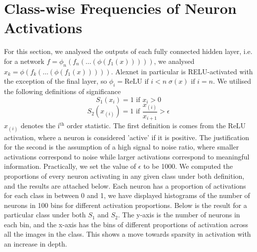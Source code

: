 \documentclass{article}
\begin{document}
    \section{Class-wise Frequencies of Neuron Activations}
        For this section, we analysed the outputs of each fully connected hidden layer, i.e. for a network $f = \phi_{n}(f_{n}(\dots(\phi(f_1(x)))))$, we analysed $x_k = \phi(f_{k}(\dots(\phi(f_1(x)))))$. Alexnet in particular is RELU-activated with the exception of the final layer, so $\phi_i = \text{ReLU} \text{ if } i < n \; \sigma(x) \text{ if } i = n$. We utilised the following definitions of significance \\
        \[S_1(x_{i}) = 1 \text{ if } x_i > 0\] 
        \[S_2(x_{(i)}) = 1 \text{ if } \frac{x_{(i)}}{x_{i+1}} > \epsilon\] 
        $x_{(i)}$ denotes the i$^\text{th}$ order statistic. The first definition is comes from the ReLU activation, where a neuron is considered 'active' if it is positive. The justification for the second is the assumption of a high signal to noise ratio, where smaller activations correspond to noise while larger activations correspond to meaningful information. Practically, we set the value of $\epsilon$ to be 1000. We computed the proportions of every neuron activating in any given class under both definition, and the results are attached below. Each neuron has a proportion of activations for each class in between 0 and 1, we have displayed histograms of the number of neurons in 100 bins for different activation proportions. Below is the result for a particular class under both $S_1$ and $S_2$. The y-axis is the number of neurons in each bin, and the x-axis has the bins of different proportions of activation across all the images in the class. This shows a move towards sparsity in activation with an increase in depth.
\end{document}
